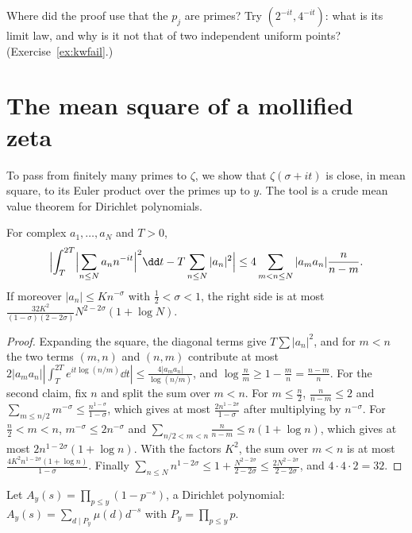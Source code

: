 \begin{think}
Where did the proof use that the $p_j$ are primes? Try $(2^{-it},4^{-it})$: what is its limit law, and why is it not that of two independent uniform points? (Exercise~\ref{ex:kwfail}.)
\end{think}

\section{The mean square of a mollified zeta}

To pass from finitely many primes to $\zeta$, we show that $\zeta(\sigma+it)$ is close, in mean square, to its Euler product over the primes up to $y$. The tool is a crude mean value theorem for Dirichlet polynomials.

\begin{lemma}\label{lem:crudemvt}
For complex $a_1,\dots,a_N$ and $T>0$,
\[
\Bigl|\int_T^{2T}\Bigl|\sum_{n\le N}a_nn^{-it}\Bigr|^2\dd t-T\sum_{n\le N}|a_n|^2\Bigr|\le4\sum_{m<n\le N}|a_ma_n|\frac n{n-m}.
\]
If moreover $|a_n|\le Kn^{-\sigma}$ with $\frac12<\sigma<1$, the right side is at most $\frac{32K^2}{(1-\sigma)(2-2\sigma)}N^{2-2\sigma}(1+\log N)$.
\end{lemma}
\begin{proof}
Expanding the square, the diagonal terms give $T\sum|a_n|^2$, and for $m<n$ the two terms $(m,n)$ and $(n,m)$ contribute at most $2|a_ma_n||\int_T^{2T}e^{it\log(n/m)}\dd t|\le\frac{4|a_ma_n|}{\log(n/m)}$, and $\log\frac nm\ge1-\frac mn=\frac{n-m}n$. For the second claim, fix $n$ and split the sum over $m<n$. For $m\le\frac n2$, $\frac n{n-m}\le2$ and $\sum_{m\le n/2}m^{-\sigma}\le\frac{n^{1-\sigma}}{1-\sigma}$, which gives at most $\frac{2n^{1-2\sigma}}{1-\sigma}$ after multiplying by $n^{-\sigma}$. For $\frac n2<m<n$, $m^{-\sigma}\le2n^{-\sigma}$ and $\sum_{n/2<m<n}\frac n{n-m}\le n(1+\log n)$, which gives at most $2n^{1-2\sigma}(1+\log n)$. With the factors $K^2$, the sum over $m<n$ is at most $\frac{4K^2n^{1-2\sigma}(1+\log n)}{1-\sigma}$. Finally $\sum_{n\le N}n^{1-2\sigma}\le1+\frac{N^{2-2\sigma}}{2-2\sigma}\le\frac{2N^{2-2\sigma}}{2-2\sigma}$, and $4\cdot4\cdot2=32$.
\end{proof}

Let $A_y(s)=\prod_{p\le y}(1-p^{-s})$, a Dirichlet polynomial: $A_y(s)=\sum_{d\mid P_y}\mu(d)d^{-s}$ with $P_y=\prod_{p\le y}p$.

